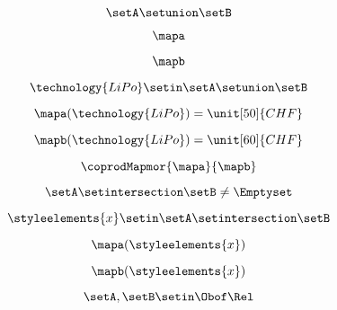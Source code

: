 \begin{forslides}
    \begin{equation}
        \label{eq:combination-108}
        \setA\setunion \setB
    \end{equation}

    \begin{equation}
        \label{eq:combination-109}
        \mapa
    \end{equation}

    \begin{equation}
        \label{eq:combination-110}
        \mapb
    \end{equation}

    \begin{equation}
        \label{eq:combination-111}
        \technology{LiPo}\setin \setA\setunion \setB
    \end{equation}

    \begin{equation}
        \label{eq:combination-112}
        \mapa(\technology{LiPo})=\unit[50]{CHF}
    \end{equation}

    \begin{equation}
        \label{eq:combination-113}
        \mapb(\technology{LiPo})=\unit[60]{CHF}
    \end{equation}

    \begin{equation}
        \label{eq:combination-114}
        \coprodMapmor{\mapa}{\mapb}
    \end{equation}

    \begin{equation}
        \label{eq:combination-115}
        \setA\setintersection \setB\neq \Emptyset
    \end{equation}

    \begin{equation}
        \label{eq:combination-116}
        \styleelements{x}\setin \setA\setintersection \setB
    \end{equation}

    \begin{equation}
        \label{eq:combination-117}
        \mapa(\styleelements{x})
    \end{equation}

    \begin{equation}
        \label{eq:combination-118}
        \mapb(\styleelements{x})
    \end{equation}

    \begin{equation}
        \label{eq:combination-119}
        \setA,\setB\setin \Obof\Rel
    \end{equation}


\end{forslides}
